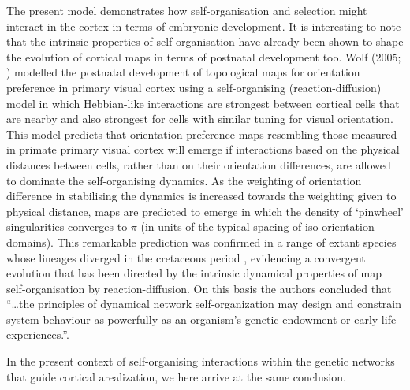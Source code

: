 \documentclass[10pt,letterpaper]{article}
\begin{document}
The present model demonstrates how self-organisation and selection might interact in the cortex in terms of embryonic development. It is interesting to note that the intrinsic properties of self-organisation have already been shown to shape the evolution of cortical maps in terms of postnatal development too. Wolf (2005; \cite{Wolf2005}) modelled the postnatal development of topological maps for orientation preference in primary visual cortex using a self-organising (reaction-diffusion) model in which Hebbian-like interactions are strongest between cortical cells that are nearby and also strongest for cells with similar tuning for visual orientation. This model predicts that orientation preference maps resembling those measured in primate primary visual cortex will emerge if interactions based on the physical distances between cells, rather than on their orientation differences, are allowed to dominate the self-organising dynamics. As the weighting of orientation difference in stabilising the dynamics is increased towards the weighting given to physical distance, maps are predicted to emerge in which the density of `pinwheel' singularities converges to $\pi$ (in units of the typical spacing of iso-orientation domains). This remarkable prediction was confirmed in a range of extant species whose lineages diverged in the cretaceous period \cite{Kaschube2010}, evidencing a convergent evolution that has been directed by the intrinsic dynamical properties of map self-organisation by reaction-diffusion. On this basis the authors concluded that ``\ldots the principles of dynamical network self-organization may design and constrain system behaviour as powerfully as an organism's genetic endowment or early life experiences.''.

In the present context of self-organising interactions within the genetic networks that guide cortical arealization, we here arrive at the same conclusion.


\end{document}
